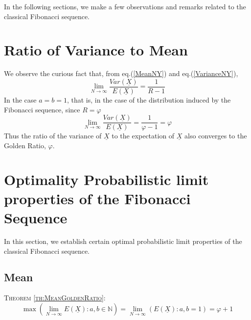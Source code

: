 \begin{multicols}{2}
In the following sections, we make a few observations and remarks related to the classical Fibonacci sequence.

\vspace{-.3cm}

\section{Ratio of Variance to Mean}\label{section-9}
We observe the curious fact that, from eq.(\ref{MeanNY}) and eq.(\ref{VarianceNY}),
\begin{equation}
\lim_{N\rightarrow \infty} \frac{Var(\underline{X})}{E(\underline{X})} = \frac{1}{R-1}\label{eq-9.1}
\end{equation}
In the case $a = b = 1$, that is, in the case of the distribution induced by the Fibonacci sequence, since $R = \varphi$
\begin{equation}
\lim_{N\rightarrow \infty} \frac{Var(\underline{X})}{E(\underline{X})} = \frac{1}{\varphi-1} = \varphi\label{eq-9.2}
\end{equation}
Thus the ratio of the variance of $\underline{X}$ to the expectation of $\underline{X}$ also converges to the Golden Ratio, $\varphi$.

\section{Optimality Probabilistic limit\\ properties of the Fibonacci\\ Sequence}\label{section-10}
In this section, we establish certain optimal probabilistic limit properties of the classical Fibonacci sequence. 

\subsection{Mean}\label{subsection-10.1}
\textsc{Theorem {\ref{th:MeanGoldenRatio}}:}
{\fontsize{8}{9}\selectfont\begin{equation*}
\max{\left(\lim_{N\rightarrow \infty} E(\underline{X}): a, b \in \mathbb N\right)} = \lim_{N \rightarrow \infty}\left(E(\underline{X}) : a,b = 1\right) = \varphi + 1
\end{equation*}}

\vspace{-1cm}


\end{multicols}
